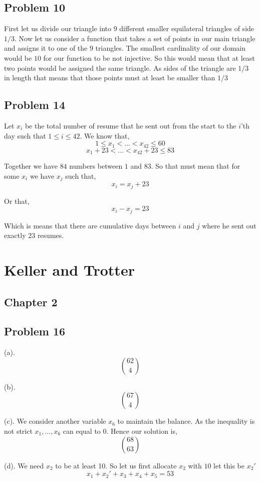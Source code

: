 \documentclass[a4paper]{report}
\begin{document}
\subsection*{Problem 10}

First let us divide our triangle into 9 different smaller equilateral triangles of side $1 /3$. Now let us consider a function that takes a set of points in  our main triangle and assigns it to one of the 9 triangles. The smallest cardinality of our domain would be  $10$ for our function to be not injective. So this would mean that at least two points would be assigned the same triangle. As sides of the triangle are $1 /3$ in length that means that those points must at least be smaller  than $1 /3$
\subsection*{Problem 14}
Let $x_i$ be the total number of resume that he sent out from the start to the $i$'th day such that $1 \le i \le 42$. We know that,  
$$ 1 \le x_1 < \dots < x_{42} \le 60 $$ 
$$ x_1 + 23  < \dots <x_{42} + 23 \le 83 $$ 

Together we have $84$ numbers between $1$ and $83$. So that must mean that for some $x_i$ we have $x_j$ such that, 
$$ x_i = x_j + 23 $$ 

Or that, 
$$ x_i - x_j = 23 $$ 

Which is means that there are cumulative days between $i$ and $j$ where he sent out exactly 23 resumes.



\section*{Keller and Trotter}
\subsection*{Chapter 2}

\subsection*{Problem 16}
(a). $${62 \choose 4}$$

(b).$${67 \choose 4}$$

(c). We consider another variable $x_6$ to maintain the balance. As the inequality is not strict $x_1,\dots,x_6$ can equal to 0. Hence our solution is, 
$$ 68 \choose 63 $$ 

(d).
We need $x_2$ to be at least 10. So let us first allocate $x_2$ with $10$ let this be $x_2'$
$$ x_1 + x_2' + x_3 + x_4 + x_5 = 53$$ 
\end{document}
